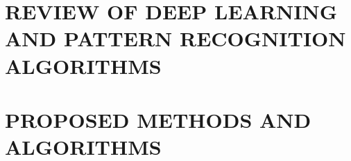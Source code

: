 \documentclass[14pt,epsfig,times]{report}
\begin{document}
\chapter{REVIEW OF DEEP LEARNING AND PATTERN RECOGNITION ALGORITHMS}\label{ch3}


\chapter{PROPOSED METHODS AND ALGORITHMS}\label{ch4}


%

%
%

%
\end{document}
